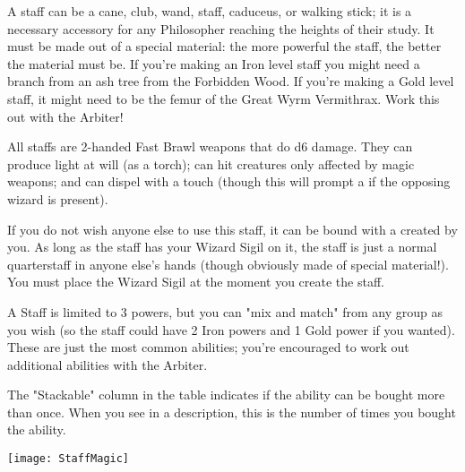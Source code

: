 


A staff can be a cane, club, wand, staff, caduceus, or walking stick; it is a necessary accessory for any Philosopher reaching the heights of their study. It must be made out of a special material: the more powerful the staff, the better the material must be.  If you're making an Iron level staff you might need a branch from an ash tree from the Forbidden Wood.  If you're making a Gold level staff, it might need to be the femur of the Great Wyrm Vermithrax.  Work this out with the Arbiter!

All staffs are 2-handed Fast Brawl weapons that do d6 damage.  They can produce light at will (as a torch); can hit creatures only affected by magic weapons; and can dispel  with a touch (though this will prompt a  if the opposing wizard is present).

If you do not wish anyone else to use this staff, it can be bound with a  created by you. As long as the staff has your Wizard Sigil on it, the staff is just a normal quarterstaff in anyone else's hands (though obviously made of special material!).  You must place the Wizard Sigil at the moment you create the staff.

A Staff is limited to 3 powers, but you can "mix and match" from any group as you wish (so the staff could have 2 Iron powers and 1 Gold power if you wanted). These are just the most common abilities; you're encouraged to work out additional abilities with the Arbiter.

The "Stackable" column in the table indicates if the ability can be bought more than once.  When you see \NUM in a description, this is the number of times you bought the ability.

  \begin{center}
    \texttt{[image: StaffMagic]}
  \end{center}






